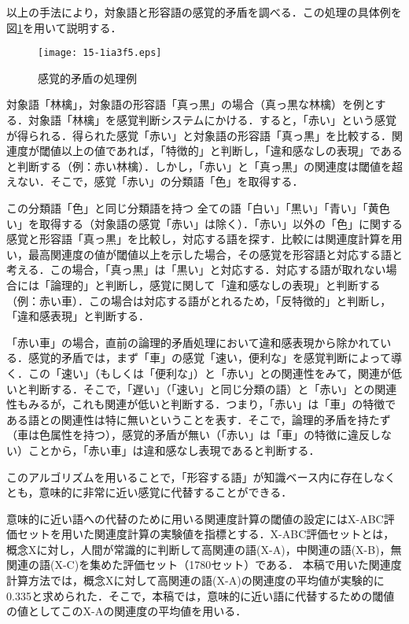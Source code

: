 \documentclass[japanese]{jnlp_1.4}
\begin{document}
以上の手法により，対象語と形容語の感覚的矛盾を調べる．この処理の具体例を図\ref{fig:KankakutekiMujun}を用いて説明する．

\begin{figure}[t]
	\begin{center}
    \texttt{[image: 15-1ia3f5.eps]}
	\caption{感覚的矛盾の処理例}
	\label{fig:KankakutekiMujun}
	\end{center}
\vspace{-0.5\baselineskip}
\end{figure}

対象語「林檎」，対象語の形容語「真っ黒」の場合（真っ黒な林檎）を例とする．対象語「林檎」を感覚判断システムにかける．すると，「赤い」という感覚が得られる．得られた感覚「赤い」と対象語の形容語「真っ黒」を比較する．関連度が閾値以上の値であれば，「特徴的」と判断し，「違和感なしの表現」であると判断する（例：赤い林檎）．しかし，「赤い」と「真っ黒」の関連度は閾値を超えない．そこで，感覚「赤い」の分類語「色」を取得する．

この分類語「色」と同じ分類語を持つ
\pagebreak
全ての語「白い」「黒い」「青い」「黄色い」を取得する（対象語の感覚「赤い」は除く）．「赤い」以外の「色」に関する感覚と形容語「真っ黒」を比較し，対応する語を探す．比較には関連度計算を用い，最高関連度の値が閾値以上を示した場合，その感覚を形容語と対応する語と考える．この場合，「真っ黒」は「黒い」と対応する．対応する語が取れない場合には「論理的」と判断し，感覚に関して「違和感なしの表現」と判断する（例：赤い車）．この場合は対応する語がとれるため，「反特徴的」と判断し，「違和感表現」と判断する．

「赤い車」の場合，直前の論理的矛盾処理において違和感表現から除かれている．感覚的矛盾では，まず「車」の感覚「速い，便利な」を感覚判断によって導く．この「速い」（もしくは「便利な」）と「赤い」との関連性をみて，関連が低いと判断する．そこで，「遅い」（「速い」と同じ分類の語）と「赤い」との関連性もみるが，これも関連が低いと判断する．つまり，「赤い」は「車」の特徴である語との関連性は特に無いということを表す．そこで，論理的矛盾を持たず（車は色属性を持つ），感覚的矛盾が無い（「赤い」は「車」の特徴に違反しない）ことから，「赤い車」は違和感なし表現であると判断する．

このアルゴリズムを用いることで，「形容する語」が知識ベース内に存在しなくとも，意味的に非常に近い感覚に代替することができる．

意味的に近い語への代替のために用いる関連度計算の閾値の設定にはX-ABC評価セットを用いた関連度計算の実験値を指標とする．X-ABC評価セットとは，概念Xに対し，人間が常識的に判断して高関連の語(X-A)，中関連の語(X-B)，無関連の語(X-C)を集めた評価セット（1780セット）である．
本稿で用いた関連度計算方法では，概念Xに対して高関連の語(X-A)の関連度の平均値が実験的に0.335と求められた．そこで，本稿では，意味的に近い語に代替するための閾値の値としてこのX-Aの関連度の平均値を用いる．
\end{document}
